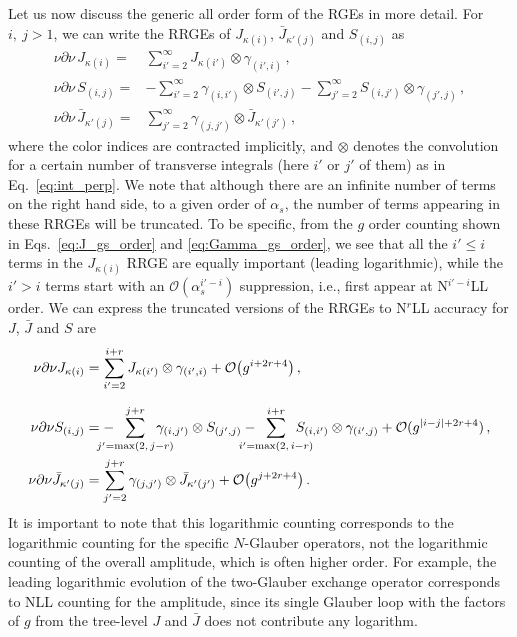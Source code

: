 \documentclass[letterpaper,11pt]{article}
\newcommand{\eq}[1]{Eq.~\eqref{eq:#1}}
\newcommand{\abs}[1]{\lvert#1\rvert}
\newcommand{\gs}{g}
\newcommand{\cO}{\mathcal{O}}
\begin{document}
Let us now discuss the generic all order form of the RGEs in more detail.
For $i,~j>1$, we can write the RRGEs of $J_{\kappa(i)}$, $\bar J_{\kappa'(j)}$ and $S_{(i,j)}$ as 
\begin{subequations}
\begin{align}
 \label{eq:J_RGE}
  \nu\partial\nu\, J_{\kappa(i)}=& \sum_{i'=2}^\infty J_{\kappa(i')} \otimes \gamma_{(i',i)}\,,\\
  \label{eq:S_RGE}
  \nu\partial\nu\, S_{(i,j)}=& -\sum_{i'=2}^\infty \gamma_{(i,i')}\otimes S_{(i',j)} - \sum_{j'=2}^{\infty}S_{(i,j')}\otimes \gamma_{(j',j)}\,,\\
  \nu\partial\nu\, \bar J_{\kappa'(j)}=& \sum_{j'=2}^\infty \gamma_{(j,j')} \otimes \bar J_{\kappa'(j')} \,,
\end{align}
\end{subequations}
where the color indices are contracted implicitly, and $\otimes$ denotes the  convolution for a certain number of transverse integrals (here $i'$ or $j'$ of them) as in \eq{int_perp}.
We note that although there are an infinite number of terms on the right hand side, to a given order of $\alpha_s$, the number of terms appearing in these RRGEs will be truncated.
To be specific, from the $\gs$ order counting shown in Eqs.~\eqref{eq:J_gs_order} and \eqref{eq:Gamma_gs_order}, we see that all the $i'\le i$ terms in the $J_{\kappa(i)}$ RRGE are equally important (leading logarithmic), while the $i'> i$ terms start with an $\cO(\alpha_s^{i'-i})$ suppression, i.e., first appear at N$^{i'-i}$LL order.
We can express the truncated versions of the RRGEs to N$^r$LL accuracy for $J$, $\bar J$ and $S$ are
\begin{subequations} \label{eq:JSJ_RGE_truncated}
\begin{align}\label{eq:J_RGE_truncated}
  \nu\partial\nu J_{\kappa(i)}
  &= \sum_{i'=2}^{i+r} J_{\kappa(i')} \otimes \gamma_{(i',i)} +\cO\bigl(\gs^{i+2r+4}\bigr) \,,\\[.1in]
  \label{eq:S_RGE_truncated}
  \nu\partial\nu S_{(i,j)}
  &= -\hspace{-0.5cm}\sum_{j'=\max(2,\,j-r)}^{j+r} \hspace{-0.5cm} \gamma_{(i,j')}\otimes S_{(j',j)} - \hspace{-0.5cm}\sum_{i'=\max(2,\,i-r)}^{i+r}\hspace{-0.5cm}  S_{(i,i')}\otimes \gamma_{(i',j)}+\cO(\gs^{\abs{i-j}+2r+4})\,,\\
  \nu\partial\nu \bar J_{\kappa'(j)}&= \sum_{j'=2}^{j+r} \gamma_{(j,j')} \otimes \bar J_{\kappa'(j')} +\cO\bigl(\gs^{j+2r+4}\bigr) \,.
\end{align}
\end{subequations}
It is important to note that this logarithmic counting corresponds to the logarithmic counting for the specific $N$-Glauber operators, not the logarithmic counting of the overall amplitude, which is often higher order. For example, the leading logarithmic evolution of the two-Glauber exchange operator corresponds to NLL counting for the amplitude, since its single Glauber loop with the factors of $g$ from the tree-level $J$ and $\bar J$ does not contribute any logarithm.
\end{document}
